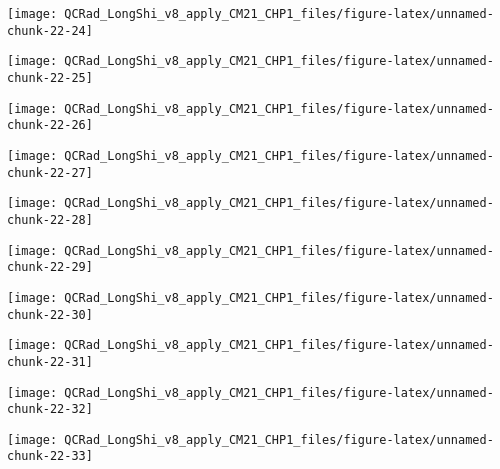 \documentclass[
  10pt,
  a4paper,oneside]{article}
\begin{document}
\begin{center}\texttt{[image: QCRad\_LongShi\_v8\_apply\_CM21\_CHP1\_files/figure-latex/unnamed-chunk-22-24]} \end{center}

\begin{center}\texttt{[image: QCRad\_LongShi\_v8\_apply\_CM21\_CHP1\_files/figure-latex/unnamed-chunk-22-25]} \end{center}

\begin{center}\texttt{[image: QCRad\_LongShi\_v8\_apply\_CM21\_CHP1\_files/figure-latex/unnamed-chunk-22-26]} \end{center}

\begin{center}\texttt{[image: QCRad\_LongShi\_v8\_apply\_CM21\_CHP1\_files/figure-latex/unnamed-chunk-22-27]} \end{center}

\begin{center}\texttt{[image: QCRad\_LongShi\_v8\_apply\_CM21\_CHP1\_files/figure-latex/unnamed-chunk-22-28]} \end{center}

\begin{center}\texttt{[image: QCRad\_LongShi\_v8\_apply\_CM21\_CHP1\_files/figure-latex/unnamed-chunk-22-29]} \end{center}

\begin{center}\texttt{[image: QCRad\_LongShi\_v8\_apply\_CM21\_CHP1\_files/figure-latex/unnamed-chunk-22-30]} \end{center}

\begin{center}\texttt{[image: QCRad\_LongShi\_v8\_apply\_CM21\_CHP1\_files/figure-latex/unnamed-chunk-22-31]} \end{center}

\begin{center}\texttt{[image: QCRad\_LongShi\_v8\_apply\_CM21\_CHP1\_files/figure-latex/unnamed-chunk-22-32]} \end{center}

\begin{center}\texttt{[image: QCRad\_LongShi\_v8\_apply\_CM21\_CHP1\_files/figure-latex/unnamed-chunk-22-33]} \end{center}
\end{document}
